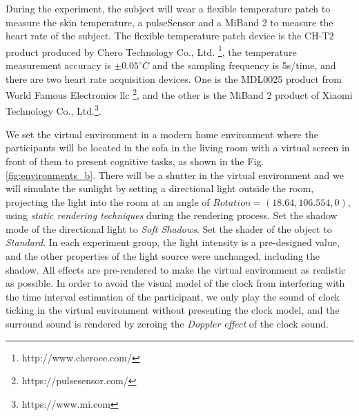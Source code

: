 \documentclass[sigconf]{acmart}
\begin{document}

During the experiment, the subject will wear a flexible temperature patch to measure the skin temperature, a pulseSensor and a MiBand 2 to measure the heart rate of the subject. The flexible temperature patch device is the CH-T2 product produced by Chero Technology Co., Ltd. \footnote[1]{http://www.cheroee.com/}, the temperature measurement accuracy is $\pm 0.05 ^{\circ}C$ and the sampling frequency is 5s/time, and there are two heart rate acquisition devices. One is the MDL0025 product from World Famous Electronics llc \footnote[2]{https://pulsesensor.com/}, and the other is the MiBand 2 product of Xiaomi Technology Co., Ltd.\footnote[3]{https://www.mi.com}.


We set the virtual environment in a modern home environment where the participants will be located in the sofa in the living room with a virtual screen in front of them to present cognitive tasks, as shown in the Fig. \ref{fig:environments_b}. There will be a shutter in the virtual environment and we will simulate the sunlight by setting a directional light outside the room, projecting the light into the room at an angle of $Rotation = (18.64, 106.554, 0)$, using \emph{static rendering techniques} during the rendering process. Set the shadow mode of the directional light to \emph{Soft Shadows}. Set the shader of the object to \emph{Standard}. In each experiment group, the light intensity is a pre-designed value, and the other properties of the light source were unchanged, including the shadow. All effects are pre-rendered to make the virtual environment as realistic as possible. In order to avoid the visual model of the clock from interfering with the time interval estimation of the participant, we only play the sound of clock ticking in the virtual environment without presenting the clock model, and the surround sound is rendered by zeroing the \emph{Doppler effect} of the clock sound.
\end{document}
